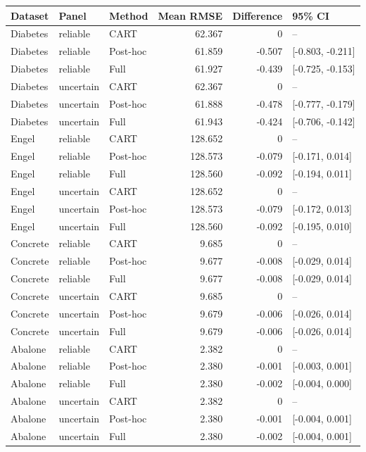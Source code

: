 \begin{tabular}{lllrrl}
\toprule
Dataset & Panel & Method & Mean RMSE & Difference & 95\% CI \\
\midrule
Diabetes & reliable & CART & 62.367 & 0 & -- \\
Diabetes & reliable & Post-hoc & 61.859 & -0.507 & [-0.803, -0.211] \\
Diabetes & reliable & Full & 61.927 & -0.439 & [-0.725, -0.153] \\
Diabetes & uncertain & CART & 62.367 & 0 & -- \\
Diabetes & uncertain & Post-hoc & 61.888 & -0.478 & [-0.777, -0.179] \\
Diabetes & uncertain & Full & 61.943 & -0.424 & [-0.706, -0.142] \\
Engel & reliable & CART & 128.652 & 0 & -- \\
Engel & reliable & Post-hoc & 128.573 & -0.079 & [-0.171, 0.014] \\
Engel & reliable & Full & 128.560 & -0.092 & [-0.194, 0.011] \\
Engel & uncertain & CART & 128.652 & 0 & -- \\
Engel & uncertain & Post-hoc & 128.573 & -0.079 & [-0.172, 0.013] \\
Engel & uncertain & Full & 128.560 & -0.092 & [-0.195, 0.010] \\
Concrete & reliable & CART & 9.685 & 0 & -- \\
Concrete & reliable & Post-hoc & 9.677 & -0.008 & [-0.029, 0.014] \\
Concrete & reliable & Full & 9.677 & -0.008 & [-0.029, 0.014] \\
Concrete & uncertain & CART & 9.685 & 0 & -- \\
Concrete & uncertain & Post-hoc & 9.679 & -0.006 & [-0.026, 0.014] \\
Concrete & uncertain & Full & 9.679 & -0.006 & [-0.026, 0.014] \\
Abalone & reliable & CART & 2.382 & 0 & -- \\
Abalone & reliable & Post-hoc & 2.380 & -0.001 & [-0.003, 0.001] \\
Abalone & reliable & Full & 2.380 & -0.002 & [-0.004, 0.000] \\
Abalone & uncertain & CART & 2.382 & 0 & -- \\
Abalone & uncertain & Post-hoc & 2.380 & -0.001 & [-0.004, 0.001] \\
Abalone & uncertain & Full & 2.380 & -0.002 & [-0.004, 0.001] \\

\end{tabular}
